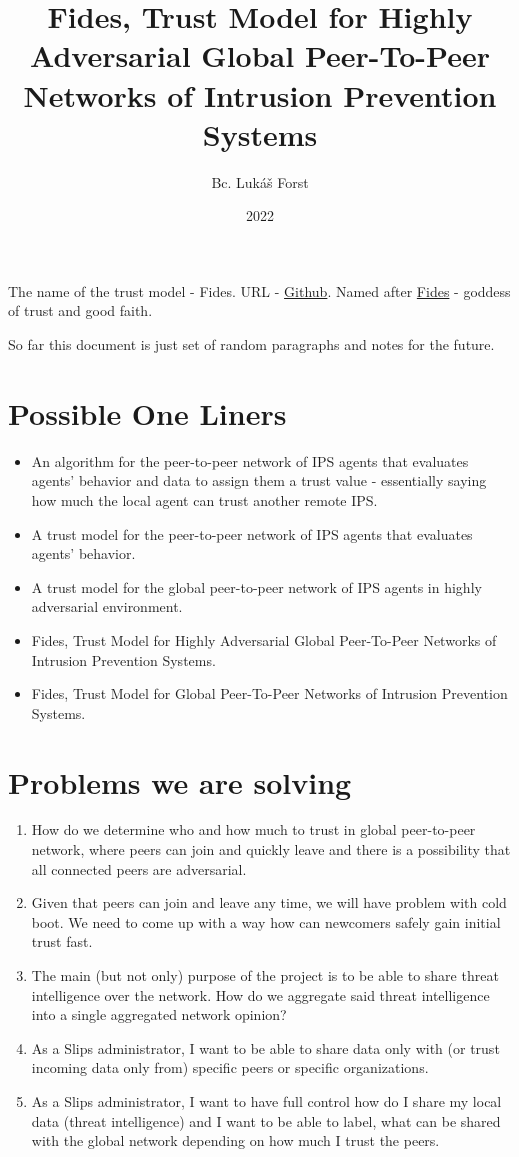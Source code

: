 \documentclass{article}
\title{Fides, Trust Model for Highly Adversarial Global Peer-To-Peer Networks of Intrusion Prevention Systems}
\author{Bc. Lukáš Forst}
\date{2022}
\begin{document}
\maketitle

The name of the trust model - Fides. URL - \href{https://github.com/LukasForst/fides}{Github}.
Named after \href{https://en.wikipedia.org/wiki/Fides_(deity)}{Fides} - goddess of trust and good faith.

So far this document is just set of random paragraphs and notes for the future.

\section{Possible One Liners}
\begin{itemize}
\item An algorithm for the peer-to-peer network of IPS agents that evaluates agents’ behavior and data to assign them a trust value - essentially saying how much the local agent can trust another remote IPS.
\item A trust model for the peer-to-peer network of IPS agents that evaluates agents’ behavior.
\item A trust model for the global peer-to-peer network of IPS agents in highly adversarial environment.
\item Fides, Trust Model for Highly Adversarial Global Peer-To-Peer Networks of Intrusion Prevention Systems.
\item Fides, Trust Model for Global Peer-To-Peer Networks of Intrusion Prevention Systems.
\end{itemize}

\section{Problems we are solving}
\begin{enumerate}
\item How do we determine who and how much to trust in global peer-to-peer network, where peers can join and quickly leave and there is a possibility that all connected peers are adversarial.
\item Given that peers can join and leave any time, we will have problem with cold boot. We need to come up with a way how can newcomers safely gain initial trust fast.
\item The main (but not only) purpose of the project is to be able to share threat intelligence over the network. How do we aggregate said threat intelligence into a single aggregated network opinion?
\item As a Slips administrator, I want to be able to share data only with (or trust incoming data only from) specific peers or specific organizations.
\item As a Slips administrator, I want to have full control how do I share my local data (threat intelligence) and I want to be able to label, what can be shared with the global network depending on how much I trust the peers.
\end{enumerate}













\medskip

\printbibliography
\end{document}
